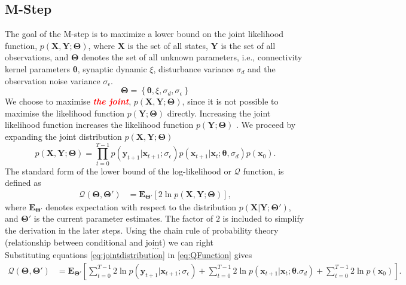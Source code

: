 \documentclass[]{article}
\newcommand{\dean}[1]{\textsf{\emph{\textbf{\textcolor{red}{#1}}}}}
\begin{document}
\subsection{M-Step}
The goal of the M-step is to maximize a lower bound on the joint likelihood function, $p(\mathbf X,\mathbf Y;\boldsymbol \Theta)$, where $\mathbf X$ is the set of all states, $\mathbf Y$ is the set of all observations, and $\boldsymbol \Theta$ denotes the set of all unknown parameters, i.e., connectivity kernel parameters $\boldsymbol\theta$, synaptic dynamic $\xi$, disturbance variance $\sigma_d$ and the observation noise variance $\sigma_{\epsilon}$.
\begin{equation}
	\boldsymbol\Theta = \left\lbrace \boldsymbol\theta, \xi, \sigma_d, \sigma_{\epsilon}\right\rbrace 
\end{equation} We choose to maximise \dean{the joint}, $p(\mathbf X,\mathbf Y;\boldsymbol \Theta)$, since it is not  possible to maximise the likelihood function $p(\mathbf Y;\boldsymbol\Theta)$ directly. Increasing the joint likelihood function increases the likelihood function $p(\mathbf Y;\boldsymbol \Theta)$ \cite{McLachlan1997}. We proceed by expanding the joint distribution $p(\mathbf X,\mathbf Y;\boldsymbol \Theta)$
\begin{equation}\label{eq:jointdistribution}
 p(\mathbf X,\mathbf Y;\boldsymbol \Theta)=\prod_{t=0}^{T-1} p(\mathbf y_{t+1}|\mathbf x_{t+1}; \sigma_{\epsilon})p(\mathbf x_{t+1}|\mathbf x_{t};\boldsymbol \theta, \sigma_d)p(\mathbf x_0).
\end{equation}
The standard form of the lower bound of the log-likelihood or $\mathcal{Q}$ function, is defined as   
\begin{align}\label{eq:QFunction}
 \mathcal Q(\boldsymbol \Theta,\boldsymbol\Theta')&=\mathbf E_{\boldsymbol \Theta'}\left[2\ln p(\mathbf X,\mathbf Y;\boldsymbol \Theta)\right],
\end{align}
where $ \mathbf E_{\boldsymbol \Theta'}$ denotes expectation with respect to the distribution $p(\mathbf X | \mathbf Y;\boldsymbol \Theta')$, and $\boldsymbol \Theta'$ is the current parameter estimates. The factor of $2$ is included to simplify the derivation in the later steps. Using the chain rule of probability theory (relationship between conditional and joint) we can right
\begin{equation}
	... \nonumber
\end{equation}
 Substituting equations \ref{eq:jointdistribution} in \ref{eq:QFunction} gives
\begin{align}
 \mathcal Q(\boldsymbol \Theta,\boldsymbol\Theta')&=\mathbf E_{\boldsymbol\Theta'}\left[\sum_{t=0}^{T-1}2\ln p(\mathbf y_{t+1}|\mathbf x_{t+1};\sigma_{\epsilon})+\sum_{t=0}^{T-1}2\ln p(\mathbf x_{t+1}|\mathbf x_{t};\boldsymbol \theta. \sigma_d)+\sum_{t=0}^{T-1}2\ln p(\mathbf x_0)\right].
\end{align}
\end{document}
